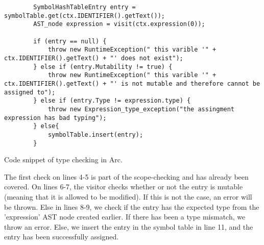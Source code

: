 \begin{listing}[htb!]
    \begin{verbatim}
        SymbolHashTableEntry entry = symbolTable.get(ctx.IDENTIFIER().getText());
        AST_node expression = visit(ctx.expression(0));

        if (entry == null) {
            throw new RuntimeException(" this varible '" + ctx.IDENTIFIER().getText() + "' does not exist");
        } else if (entry.Mutability != true) {
            throw new RuntimeException(" this varible '" + ctx.IDENTIFIER().getText() + "' is not mutable and therefore cannot be assigned to");
        } else if (entry.Type != expression.type) {
            throw new Expression_type_exception("the assingment expression has bad typing");
        } else{
            symbolTable.insert(entry);
        }
    \end{verbatim}
    \caption{Code snippet of type checking in Arc.}
    \label{lst:typecheckerexample}
\end{listing}


The first check on lines 4-5 is part of the scope-checking and has already been covered. On lines 6-7, the visitor checks whether or not the entry is mutable (meaning that it is allowed to be modified). If this is not the case, an error will be thrown. Else in lines 8-9, we check if the entry has the expected type from the 'expression' AST node created earlier. If there has been a type mismatch, we throw an error. Else, we insert the entry in the symbol table in line 11, and the entry has been successfully assigned.